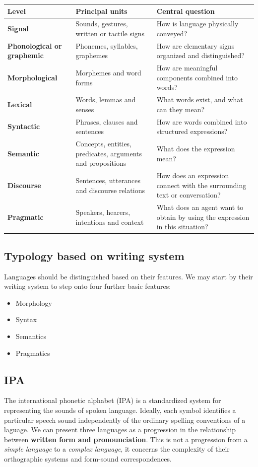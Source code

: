 \documentclass[a4paper]{article}
\theoremstyle{definition}
\begin{document}
\begin{tabularx}{\textwidth}{>{\bfseries}p{3.6cm} Y Y}
    \color{white}\bfseries Level &
    \color{white}\bfseries Principal units &
    \color{white}\bfseries Central question \\
    \toprule
    Signal & Sounds, gestures, written or tactile signs & How is language physically conveyed? \\
    Phonological or graphemic & Phonemes, syllables, graphemes & How are elementary signs organized and distinguished? \\
    Morphological & Morphemes and word forms & How are meaningful components combined into words? \\
    Lexical & Words, lemmas and senses & What words exist, and what can they mean? \\
    Syntactic & Phrases, clauses and sentences & How are words combined into structured expressions? \\
    Semantic & Concepts, entities, predicates, arguments and propositions & What does the expression mean? \\
    Discourse & Sentences, utterances and discourse relations & How does an expression connect with the surrounding text or conversation? \\
    Pragmatic & Speakers, hearers, intentions and context & What does an agent want to obtain by using the expression in this situation? \\
    \bottomrule
\end{tabularx}

\subsection{Typology based on writing system}
Languages should be distinguished based on their features. We may start by their writing system to step 
onto four further basic features:
\begin{itemize}
    \item Morphology
    \item Syntax
    \item Semantics
    \item Pragmatics
\end{itemize}

\subsection{IPA}
The international phonetic alphabet (IPA) is a standardized system for representing the sounds of spoken language.
Ideally, each symbol identifies a particular speech sound independently of the ordinary spelling conventions of a laguage.
\vspace{1em}
\noindent
\newline
We can present three languages as a progression in the relationship between \textbf{written form and pronounciation}.
This is not a progression from a \textit{simple language} to a \textit{complex language}, it concerns the complexity
of their orthographic systems and form-sound correspondences. 
\end{document}
